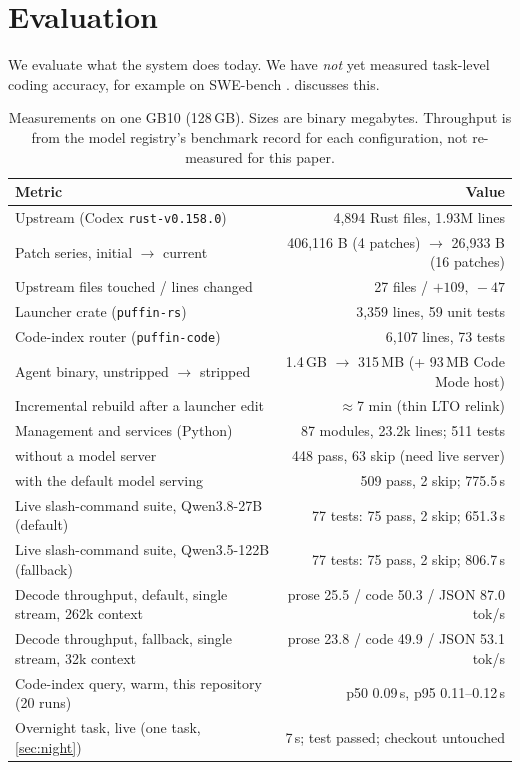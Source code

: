 \documentclass[11pt]{article}
\newcommand{\code}[1]{\texttt{#1}}
\begin{document}
\section{Evaluation}
\label{sec:eval}

We evaluate what the system does today. We have \emph{not} yet measured task-level coding accuracy,
for example on SWE-bench \cite{jimenez2024swebench}.  discusses this.

\begin{table}[t]
\centering
\small
\begin{tabular}{@{}l r@{}}
\toprule
Metric & Value \\
\midrule
Upstream (Codex \code{rust-v0.158.0}) & 4{,}894 Rust files, 1.93M lines \\
Patch series, initial $\rightarrow$ current & 406{,}116 B (4 patches) $\rightarrow$ 26{,}933 B (16 patches) \\
Upstream files touched / lines changed & 27 files / $+109,\ -47$ \\
Launcher crate (\code{puffin-rs}) & 3{,}359 lines, 59 unit tests \\
Code-index router (\code{puffin-code}) & 6{,}107 lines, 73 tests \\
Agent binary, unstripped $\rightarrow$ stripped & 1.4\,GB $\rightarrow$ 315\,MB (+ 93\,MB Code Mode host) \\
Incremental rebuild after a launcher edit & $\approx$7 min (thin LTO relink) \\
Management and services (Python) & 87 modules, 23.2k lines; 511 tests \\
\quad without a model server & 448 pass, 63 skip (need live server) \\
\quad with the default model serving & 509 pass, 2 skip; 775.5\,s \\
Live slash-command suite, Qwen3.8-27B (default) & 77 tests: 75 pass, 2 skip; 651.3\,s \\
Live slash-command suite, Qwen3.5-122B (fallback) & 77 tests: 75 pass, 2 skip; 806.7\,s \\
Decode throughput, default, single stream, 262k context & prose 25.5 / code 50.3 / JSON 87.0 tok/s \\
Decode throughput, fallback, single stream, 32k context & prose 23.8 / code 49.9 / JSON 53.1 tok/s \\
Code-index query, warm, this repository (20 runs) & p50 0.09\,s, p95 0.11--0.12\,s \\
Overnight task, live (one task, \cref{sec:night}) & 7\,s; test passed; checkout untouched \\
\bottomrule
\end{tabular}
\caption{Measurements on one GB10 (128\,GB). Sizes are binary megabytes. Throughput is from the
model registry's benchmark record for each configuration, not re-measured for this paper.}
\label{tab:eval}
\end{table}
\end{document}
